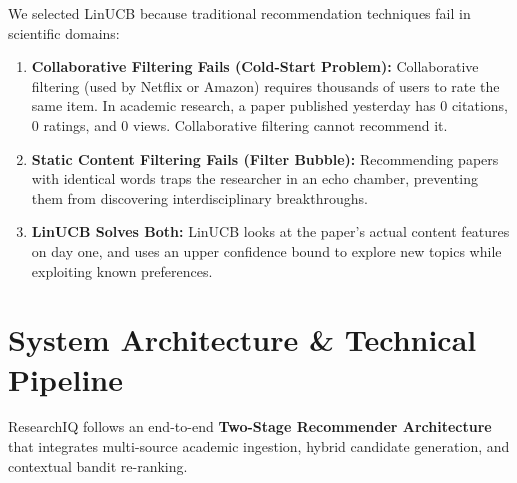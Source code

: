 \documentclass[11pt,a4paper]{article}
\begin{document}
We selected LinUCB because traditional recommendation techniques fail in scientific domains:
\begin{enumerate}[label=(\alph*),leftmargin=1.5em]
    \item \textbf{Collaborative Filtering Fails (Cold-Start Problem):} Collaborative filtering (used by Netflix or Amazon) requires thousands of users to rate the same item. In academic research, a paper published yesterday has 0 citations, 0 ratings, and 0 views. Collaborative filtering cannot recommend it.
    \item \textbf{Static Content Filtering Fails (Filter Bubble):} Recommending papers with identical words traps the researcher in an echo chamber, preventing them from discovering interdisciplinary breakthroughs.
    \item \textbf{LinUCB Solves Both:} LinUCB looks at the paper's actual content features on day one, and uses an upper confidence bound to explore new topics while exploiting known preferences.
\end{enumerate}

\section{System Architecture \& Technical Pipeline}

ResearchIQ follows an end-to-end \textbf{Two-Stage Recommender Architecture} that integrates multi-source academic ingestion, hybrid candidate generation, and contextual bandit re-ranking.
\end{document}
